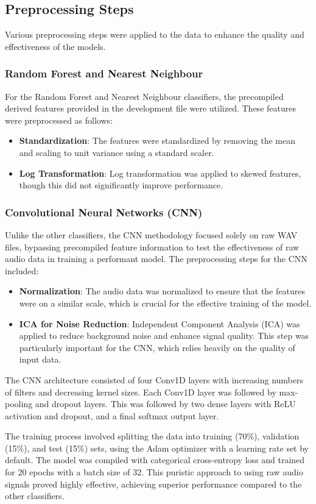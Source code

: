 \subsection{Preprocessing Steps}
Various preprocessing steps were applied to the data to enhance the quality and effectiveness of the models.

\subsubsection{Random Forest and Nearest Neighbour}
For the Random Forest and Nearest Neighbour classifiers, the precompiled derived features provided in the development file were utilized. These features were preprocessed as follows:
\begin{itemize}
    \item \textbf{Standardization}: The features were standardized by removing the mean and scaling to unit variance using a standard scaler.
    \item \textbf{Log Transformation}: Log transformation was applied to skewed features, though this did not significantly improve performance.
\end{itemize}

\subsubsection{Convolutional Neural Networks (CNN)}
Unlike the other classifiers, the CNN methodology focused solely on raw WAV files, bypassing precompiled feature information to test the effectiveness of raw audio data in training a performant model. The preprocessing steps for the CNN included:
\begin{itemize}
    \item \textbf{Normalization}: The audio data was normalized to ensure that the features were on a similar scale, which is crucial for the effective training of the model.
    \item \textbf{ICA for Noise Reduction}: Independent Component Analysis (ICA) was applied to reduce background noise and enhance signal quality. This step was particularly important for the CNN, which relies heavily on the quality of input data.
\end{itemize}

The CNN architecture consisted of four Conv1D layers with increasing numbers of filters and decreasing kernel sizes. Each Conv1D layer was followed by max-pooling and dropout layers. This was followed by two dense layers with ReLU activation and dropout, and a final softmax output layer.

The training process involved splitting the data into training (70\%), validation (15\%), and test (15\%) sets, using the Adam optimizer with a learning rate set by default. The model was compiled with categorical cross-entropy loss and trained for 20 epochs with a batch size of 32. This puristic approach to using raw audio signals proved highly effective, achieving superior performance compared to the other classifiers.
